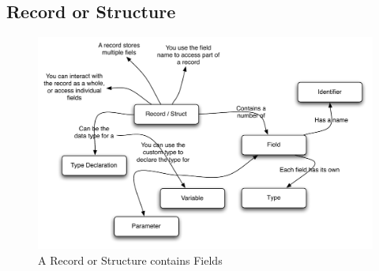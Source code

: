 \clearpage
\subsection{Record or Structure} %
\label{sub:record_or_structure}

\begin{figure}[h]
   \centering
   \includegraphics[width=\textwidth]{./topics/type-decl/diagrams/Record} 
   \caption{A Record or Structure contains Fields}
   \label{fig:type-decl-record}
\end{figure}

